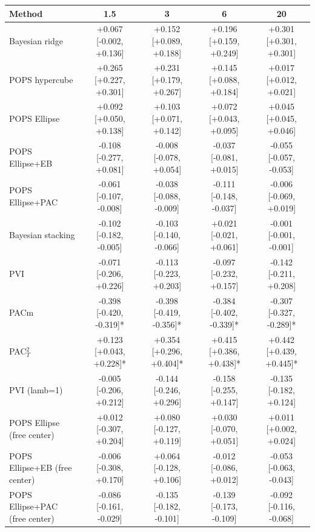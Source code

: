 \begin{tabular}{lcccc}
\toprule
Method & 1.5 & 3 & 6 & 20 \\
\midrule
Bayesian ridge & +0.067 {\scriptsize[-0.002, +0.136]} & +0.152 {\scriptsize[+0.089, +0.188]} & +0.196 {\scriptsize[+0.159, +0.249]} & +0.301 {\scriptsize[+0.301, +0.301]} \\
POPS hypercube & +0.265 {\scriptsize[+0.227, +0.301]} & +0.231 {\scriptsize[+0.179, +0.267]} & +0.145 {\scriptsize[+0.088, +0.184]} & +0.017 {\scriptsize[+0.012, +0.021]} \\
POPS Ellipse & +0.092 {\scriptsize[+0.050, +0.138]} & +0.103 {\scriptsize[+0.071, +0.142]} & +0.072 {\scriptsize[+0.043, +0.095]} & +0.045 {\scriptsize[+0.045, +0.046]} \\
POPS Ellipse+EB & -0.108 {\scriptsize[-0.277, +0.081]} & -0.008 {\scriptsize[-0.078, +0.054]} & -0.037 {\scriptsize[-0.081, +0.015]} & -0.055 {\scriptsize[-0.057, -0.053]} \\
POPS Ellipse+PAC & -0.061 {\scriptsize[-0.107, -0.008]} & -0.038 {\scriptsize[-0.088, -0.009]} & -0.111 {\scriptsize[-0.148, -0.037]} & -0.006 {\scriptsize[-0.069, +0.019]} \\
Bayesian stacking & -0.102 {\scriptsize[-0.182, -0.005]} & -0.103 {\scriptsize[-0.140, -0.066]} & +0.021 {\scriptsize[-0.021, +0.061]} & -0.001 {\scriptsize[-0.001, -0.001]} \\
PVI & -0.071 {\scriptsize[-0.206, +0.226]} & -0.113 {\scriptsize[-0.223, +0.203]} & -0.097 {\scriptsize[-0.232, +0.157]} & -0.142 {\scriptsize[-0.211, +0.208]} \\
PACm & -0.398 {\scriptsize[-0.420, -0.319]}* & -0.398 {\scriptsize[-0.419, -0.356]}* & -0.384 {\scriptsize[-0.402, -0.339]}* & -0.307 {\scriptsize[-0.327, -0.289]}* \\
PAC$^2_T$ & +0.123 {\scriptsize[+0.043, +0.228]}* & +0.354 {\scriptsize[+0.296, +0.404]}* & +0.415 {\scriptsize[+0.386, +0.438]}* & +0.442 {\scriptsize[+0.439, +0.445]}* \\
PVI (lamb=1) & -0.005 {\scriptsize[-0.206, +0.212]} & -0.144 {\scriptsize[-0.246, +0.296]} & -0.158 {\scriptsize[-0.255, +0.147]} & -0.135 {\scriptsize[-0.182, +0.124]} \\
POPS Ellipse (free center) & +0.012 {\scriptsize[-0.307, +0.204]} & +0.080 {\scriptsize[-0.127, +0.119]} & +0.030 {\scriptsize[-0.070, +0.051]} & +0.011 {\scriptsize[+0.002, +0.024]} \\
POPS Ellipse+EB (free center) & -0.006 {\scriptsize[-0.308, +0.170]} & +0.064 {\scriptsize[-0.128, +0.106]} & -0.012 {\scriptsize[-0.086, +0.012]} & -0.053 {\scriptsize[-0.063, -0.043]} \\
POPS Ellipse+PAC (free center) & -0.086 {\scriptsize[-0.161, -0.029]} & -0.135 {\scriptsize[-0.182, -0.101]} & -0.139 {\scriptsize[-0.173, -0.109]} & -0.092 {\scriptsize[-0.116, -0.068]} \\
\bottomrule
\end{tabular}

